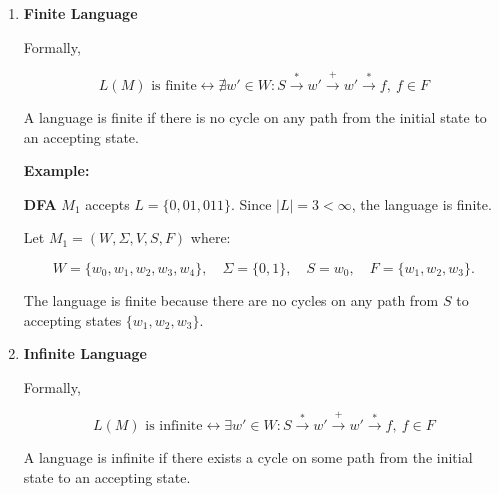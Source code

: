 \documentclass[12pt,a4paper,openany]{article}
\begin{document}
\begin{enumerate}

\item \textbf{Finite Language}

Formally,

\[
L(M) \text{ is finite} \leftrightarrow 
\nexists w' \in W : S \xrightarrow{*} w' \xrightarrow{+} w' \xrightarrow{*} f,\ f \in F
\]

A language is finite if there is no cycle on any path from the initial state to an accepting state.

\textbf{Example:}

\textbf{DFA} $M_1$ accepts $L = \{0, 01, 011\}$. Since $|L| = 3 < \infty$, the language is finite.

Let $M_1 = (W, \Sigma, V, S, F)$ where:

\[
W = \{w_0, w_1, w_2, w_3, w_4\},\quad
\Sigma = \{0,1\},\quad
S = w_0,\quad
F = \{w_1, w_2, w_3\}.
\]

\begin{center}
\end{center}

The language is finite because there are no cycles on any path from $S$ to accepting states $\{w_1, w_2, w_3\}$.

\item \textbf{Infinite Language}

Formally,

\[
L(M) \text{ is infinite} \leftrightarrow 
\exists w' \in W : S \xrightarrow{*} w' \xrightarrow{+} w' \xrightarrow{*} f,\ f \in F
\]

A language is infinite if there exists a cycle on some path from the initial state to an accepting state.


\end{enumerate}
\end{document}
